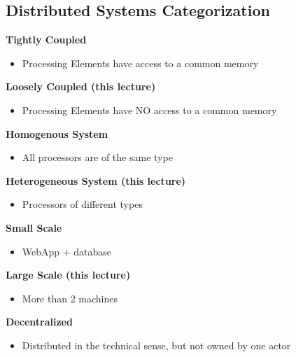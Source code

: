 \subsection{Distributed Systems Categorization}
\textbf{Tightly Coupled}
\begin{itemize}
    \item Processing Elements have access to a common memory
\end{itemize}
\textbf{Loosely Coupled (this lecture)}
\begin{itemize}
    \item Processing Elements have NO access to a common memory
\end{itemize}
\textbf{Homogenous System}
\begin{itemize}
    \item All processors are of the same type
\end{itemize}
\textbf{Heterogeneous System (this lecture)}
\begin{itemize}
    \item Processors of different types
\end{itemize}
\textbf{Small Scale}
\begin{itemize}
    \item WebApp + database
\end{itemize}
\textbf{Large Scale (this lecture)}
\begin{itemize}
    \item More than 2 machines
\end{itemize}
\textbf{Decentralized}
\begin{itemize}
    \item Distributed in the technical sense, but not owned by one actor
\end{itemize}

